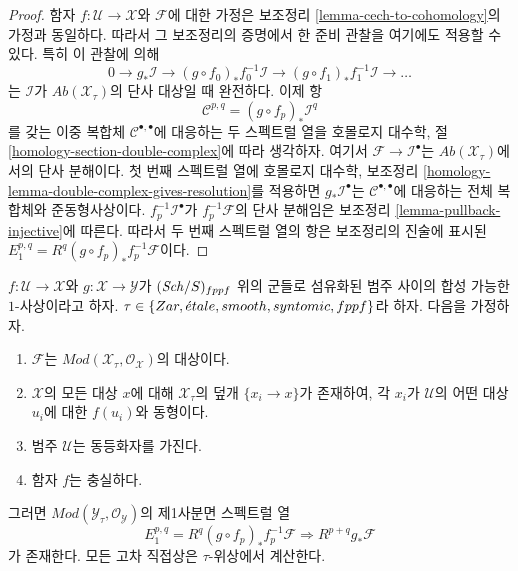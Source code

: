 \begin{proof}
함자 $f : \mathcal{U} \to \mathcal{X}$와 $\mathcal{F}$에 대한 가정은
보조정리 \ref{lemma-cech-to-cohomology}의 가정과 동일하다.
따라서 그 보조정리의 증명에서 한 준비 관찰을 여기에도 적용할 수 있다.
특히 이 관찰에 의해
$$
0 \to g_*\mathcal{I} \to
(g \circ f_0)_*f_0^{-1}\mathcal{I} \to
(g \circ f_1)_*f_1^{-1}\mathcal{I} \to \ldots
$$
는 $\mathcal{I}$가 $\textit{Ab}(\mathcal{X}_\tau)$의 단사 대상일 때
완전하다. 이제 항
$$
\mathcal{C}^{p, q} = (g \circ f_p)_*\mathcal{I}^q
$$
를 갖는 이중 복합체 $\mathcal{C}^{\bullet,\bullet}$에 대응하는
두 스펙트럴 열을 호몰로지 대수학, 절
\ref{homology-section-double-complex}에 따라 생각하자.
여기서 $\mathcal{F} \to \mathcal{I}^\bullet$는
$\textit{Ab}(\mathcal{X}_\tau)$에서의 단사 분해이다.
첫 번째 스펙트럴 열에 호몰로지 대수학, 보조정리
\ref{homology-lemma-double-complex-gives-resolution}를 적용하면
$g_*\mathcal{I}^\bullet$는 $\mathcal{C}^{\bullet,\bullet}$에 대응하는
전체 복합체와 준동형사상이다.
$f_p^{-1}\mathcal{I}^\bullet$가
$f_p^{-1}\mathcal{F}$의 단사 분해임은
보조정리 \ref{lemma-pullback-injective}에 따른다.
따라서 두 번째 스펙트럴 열의 항은 보조정리의 진술에 표시된
$E_1^{p, q} = R^q(g \circ f_p)_*f_p^{-1}\mathcal{F}$이다.
\end{proof}

\begin{lemma}
\label{lemma-cech-to-cohomology-relative-modules}
$f : \mathcal{U} \to \mathcal{X}$와 $g : \mathcal{X} \to \mathcal{Y}$가
$(\mathit{Sch}/S)_{fppf}$ 위의 군들로 섬유화된 범주 사이의 합성 가능한
$1$-사상이라고 하자. $\tau \in \{Zar, \etale, smooth, syntomic,
\linebreak[0] fppf\}$라 하자. 다음을 가정하자.
\begin{enumerate}
\item $\mathcal{F}$는
$\textit{Mod}(\mathcal{X}_\tau, \mathcal{O}_\mathcal{X})$의 대상이다.
\item $\mathcal{X}$의 모든 대상 $x$에 대해
$\mathcal{X}_\tau$의 덮개 $\{x_i \to x\}$가 존재하여,
각 $x_i$가 $\mathcal{U}$의 어떤 대상 $u_i$에 대한
$f(u_i)$와 동형이다.
\item 범주 $\mathcal{U}$는 동등화자를 가진다.
\item 함자 $f$는 충실하다.
\end{enumerate}
그러면 $\textit{Mod}(\mathcal{Y}_\tau, \mathcal{O}_\mathcal{Y})$의
제1사분면 스펙트럴 열
$$
E_1^{p, q} = R^q(g \circ f_p)_*f_p^{-1}\mathcal{F}
\Rightarrow
R^{p + q}g_*\mathcal{F}
$$
가 존재한다. 모든 고차 직접상은 $\tau$-위상에서 계산한다.
\end{lemma}

